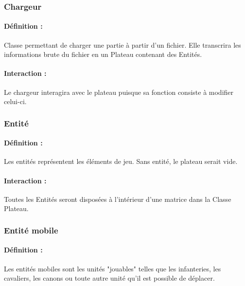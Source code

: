 \documentclass[12pt]{article}
\begin{document}
			\subsubsection{Chargeur}

				\paragraph{Définition :}

				Classe permettant de charger une partie à partir d'un fichier. Elle transcrira les informations brute du fichier en un Plateau contenant des Entités.

				\paragraph{Interaction :}

				Le chargeur interagira avec le plateau puisque sa fonction consiste à modifier celui-ci.

			\subsubsection{Entité}

				\paragraph{Définition :}

				Les entités représentent les éléments de jeu. Sans entité, le plateau serait vide.

				\paragraph{Interaction :}

				Toutes les Entités seront disposées à l'intérieur d'une matrice dans la Classe Plateau.

			\subsubsection{Entité mobile}

				\paragraph{Définition :}

				Les entités mobiles sont les unités "jouables" telles que les infanteries, les cavaliers, les canons ou toute autre unité qu'il est possible de déplacer.
\end{document}
